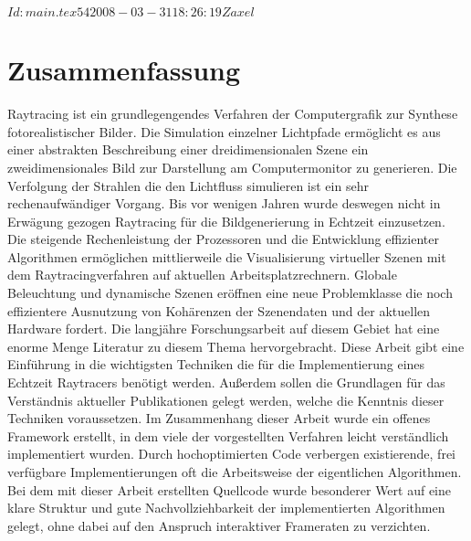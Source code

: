\svnInfo $Id: main.tex 54 2008-03-31 18:26:19Z axel $
\chapter*{\centering Zusammenfassung}

Raytracing ist ein grundlegengendes Verfahren der Computergrafik zur Synthese fotorealistischer Bilder. Die Simulation einzelner Lichtpfade ermöglicht es aus einer abstrakten Beschreibung einer dreidimensionalen Szene ein zweidimensionales Bild zur Darstellung am Computermonitor zu generieren. Die Verfolgung der Strahlen die den Lichtfluss simulieren ist ein sehr rechenaufwändiger Vorgang. Bis vor wenigen Jahren wurde deswegen nicht in Erwägung gezogen Raytracing für die Bildgenerierung in Echtzeit einzusetzen. Die steigende Rechenleistung der Prozessoren und die Entwicklung effizienter Algorithmen ermöglichen mittlierweile die Visualisierung virtueller Szenen mit dem Raytracingverfahren auf aktuellen Arbeitsplatzrechnern. Globale Beleuchtung und dynamische Szenen eröffnen eine neue Problemklasse die noch effizientere Ausnutzung von Kohärenzen der Szenendaten und der aktuellen Hardware fordert. Die langjähre Forschungsarbeit auf diesem Gebiet hat eine enorme Menge Literatur zu diesem Thema hervorgebracht. Diese Arbeit gibt eine Einführung in die wichtigsten Techniken die für die Implementierung eines Echtzeit Raytracers benötigt werden. Außerdem sollen die Grundlagen für das Verständnis aktueller Publikationen gelegt werden, welche die Kenntnis dieser Techniken voraussetzen.
Im Zusammenhang dieser Arbeit wurde ein offenes Framework erstellt, in dem viele der vorgestellten Verfahren leicht verständlich implementiert wurden. Durch hochoptimierten Code verbergen existierende, frei verfügbare Implementierungen oft die Arbeitsweise der eigentlichen Algorithmen. Bei dem mit dieser Arbeit erstellten Quellcode wurde besonderer Wert auf eine klare Struktur und gute Nachvollziehbarkeit der implementierten Algorithmen gelegt, ohne dabei auf den Anspruch interaktiver Frameraten zu verzichten.
